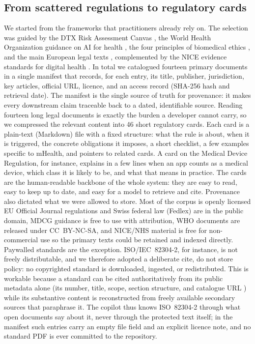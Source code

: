 \documentclass[11pt]{article}
\begin{document}
\subsection{From scattered regulations to regulatory cards}
We started from the frameworks that practitioners already rely on. The selection was
guided by the DTX Risk Assessment Canvas \citep{denecke2023dtx}, the World Health
Organization guidance on AI for health \citep{who2024aihealth}, the four principles of
biomedical ethics \citep{beauchamp2019principles}, and the main European legal texts
\citep{euaiact2024,mdr2017,gdpr2016,iso82304}, complemented by the NICE evidence
standards for digital health \citep{nice2022esf}. In total we catalogued
fourteen primary documents in a single manifest that records, for each entry,
its title, publisher, jurisdiction, key articles, official URL, licence, and an access
record (SHA-256 hash and retrieval date). The manifest is the single source of truth for
provenance: it makes every downstream claim traceable back to a dated, identifiable
source.
Reading fourteen long legal documents is exactly the burden a developer cannot carry, so
we compressed the relevant content into 46 short regulatory cards. Each card
is a plain-text (Markdown) file with a fixed structure: what the rule is about, when it
is triggered, the concrete obligations it imposes, a short checklist, a few examples
specific to mHealth, and pointers to related cards. A card on the Medical Device
Regulation, for instance, explains in a few lines when an app counts as a medical device,
which class it is likely to be, and what that means in practice. The cards are the
human-readable backbone of the whole system: they are easy to read, easy to keep up to
date, and easy for a model to retrieve and cite.
Provenance also dictated what we were allowed to store. Most of the corpus is openly
licensed EU Official Journal regulations and Swiss federal law (Fedlex) are in the
public domain, MDCG guidance is free to use with attribution, WHO documents are released
under CC~BY-NC-SA, and NICE/NHS material is free for non-commercial use so the primary
texts could be retained and indexed directly. Paywalled standards are the exception.
ISO/IEC~82304-2, for instance, is not freely distributable, and we therefore adopted a
deliberate cite, do not store policy: no copyrighted standard is downloaded,
ingested, or redistributed. This is workable because a standard can be cited
authoritatively from its public metadata alone (its number, title, scope, section
structure, and catalogue URL ) while its substantive content is reconstructed from freely
available secondary sources that paraphrase it. The copilot thus
knows ISO~82304-2 through what open documents say about it, never through the
protected text itself; in the manifest such entries carry an empty file field and an
explicit licence note, and no standard PDF is ever committed to the repository.
\end{document}
